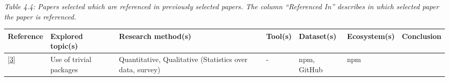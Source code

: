 \documentclass[]{book}
\begin{document}
\emph{Table 4.4: Papers selected which are referenced in previously
selected papers. The column ``Referenced In'' describes in which
selected paper the paper is referenced.}

\begin{longtable}[]{@{}lllllll@{}}
\toprule
\begin{minipage}[b]{0.09\columnwidth}\raggedright\strut
Reference\strut
\end{minipage} & \begin{minipage}[b]{0.16\columnwidth}\raggedright\strut
Explored topic(s)\strut
\end{minipage} & \begin{minipage}[b]{0.17\columnwidth}\raggedright\strut
Research method(s)\strut
\end{minipage} & \begin{minipage}[b]{0.07\columnwidth}\raggedright\strut
Tool(s)\strut
\end{minipage} & \begin{minipage}[b]{0.10\columnwidth}\raggedright\strut
Dataset(s)\strut
\end{minipage} & \begin{minipage}[b]{0.12\columnwidth}\raggedright\strut
Ecosystem(s)\strut
\end{minipage} & \begin{minipage}[b]{0.10\columnwidth}\raggedright\strut
Conclusion\strut
\end{minipage}\tabularnewline
\midrule
\endhead
\begin{minipage}[t]{0.09\columnwidth}\raggedright\strut
{[}\protect\hyperlink{ref-Abdalkareem2017}{3}{]}\strut
\end{minipage} & \begin{minipage}[t]{0.16\columnwidth}\raggedright\strut
Use of trivial packages\strut
\end{minipage} & \begin{minipage}[t]{0.17\columnwidth}\raggedright\strut
Quantitative, Qualitative (Statistics over data, survey)\strut
\end{minipage} & \begin{minipage}[t]{0.07\columnwidth}\raggedright\strut
-\strut
\end{minipage} & \begin{minipage}[t]{0.10\columnwidth}\raggedright\strut
npm, GitHub\strut
\end{minipage} & \begin{minipage}[t]{0.12\columnwidth}\raggedright\strut
npm\strut
\end{minipage} & \begin{minipage}[t]{0.10\columnwidth}\raggedright\strut

\end{minipage}
\end{longtable}
\end{document}
